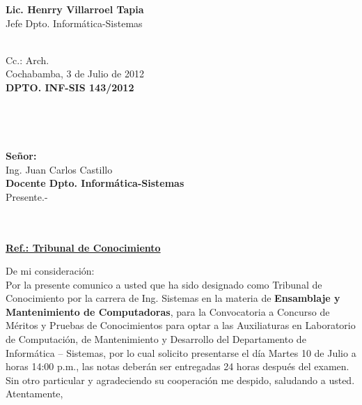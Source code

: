 \documentclass[letterpaper,11pt]{letter}
\begin{document}
\vspace{3.5cm}
\begin{center}
\begin{minipage}[b]{0.5\textwidth}
\begin{center}
{\bf Lic. Henrry Villarroel Tapia}\\
Jefe Dpto. Informática-Sistemas\\
\end{center}
\end{minipage}
\end{center}
~\\
Cc.: Arch.\\
\newpage
Cochabamba, 3 de Julio de 2012~\\
 \textbf{DPTO. INF-SIS 143/2012}\\
~\\
~\\
~\\
~\\
 \textbf{Señor:}~\\
Ing. Juan Carlos Castillo~\\
 \textbf{Docente Dpto. Informática-Sistemas}~\\
Presente.-\\
~\\
~\\
\begin{center}
\underline{ \textbf{Ref.: Tribunal de Conocimiento}}
\end{center}
De mi consideración:\\
Por la presente comunico a usted que ha sido designado como Tribunal de Conocimiento por la carrera de Ing. Sistemas en la materia de \textbf{Ensamblaje y Mantenimiento de Computadoras}, para la Convocatoria a Concurso de Méritos y Pruebas de Conocimientos para optar a las Auxiliaturas en Laboratorio de Computación, de Mantenimiento y Desarrollo del Departamento de Informática – Sistemas, por lo cual solicito presentarse el día Martes 10 de Julio a horas 14:00 p.m., las notas deberán ser entregadas 24 horas después del examen.\\
Sin otro particular y agradeciendo su cooperación me despido, saludando a usted.\\
Atentamente,\\
\end{document}
